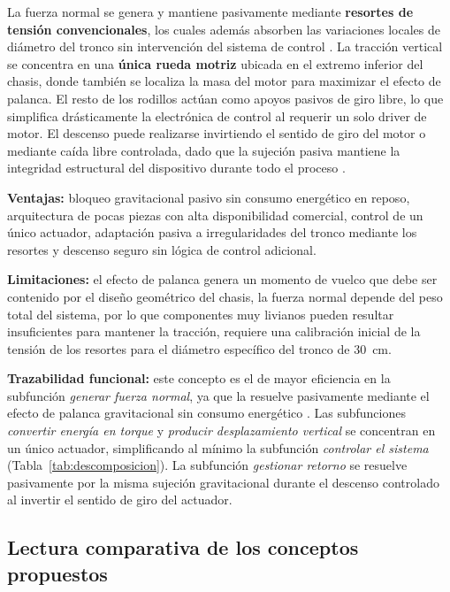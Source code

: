 \documentclass[lettersize,journal]{IEEEtran}
\begin{document}
La fuerza normal se genera y mantiene pasivamente mediante \textbf{resortes de
tensión convencionales}, los cuales además absorben las variaciones locales de
diámetro del tronco sin intervención del sistema de control
\cite{Sadeghi2012HumanInspired}. La tracción vertical se concentra en una
\textbf{única rueda motriz} ubicada en el extremo inferior del chasis, donde
también se localiza la masa del motor para maximizar el efecto de palanca. El
resto de los rodillos actúan como apoyos pasivos de giro libre, lo que simplifica
drásticamente la electrónica de control al requerir un solo driver de motor. El
descenso puede realizarse invirtiendo el sentido de giro del motor o mediante
caída libre controlada, dado que la sujeción pasiva mantiene la integridad
estructural del dispositivo durante todo el proceso
\cite{sibasad2017, ZHENG2024100617}.

\textbf{Ventajas:} bloqueo gravitacional pasivo sin consumo energético en reposo,
arquitectura de pocas piezas con alta disponibilidad comercial, control de un único
actuador, adaptación pasiva a irregularidades del tronco mediante los resortes y
descenso seguro sin lógica de control adicional.

\textbf{Limitaciones:} el efecto de palanca genera un momento de vuelco que debe ser
contenido por el diseño geométrico del chasis, la fuerza normal depende del peso
total del sistema, por lo que componentes muy livianos pueden resultar insuficientes
para mantener la tracción, requiere una calibración inicial de la tensión de los
resortes para el diámetro específico del tronco de \SI{30}{\centi\meter}.

\textbf{Trazabilidad funcional:} este concepto es el de mayor eficiencia en la
subfunción \emph{generar fuerza normal}, ya que la resuelve pasivamente mediante el
efecto de palanca gravitacional sin consumo energético \cite{Sadeghi2012HumanInspired}.
Las subfunciones \emph{convertir energía en torque} y \emph{producir desplazamiento
vertical} se concentran en un único actuador, simplificando al mínimo la subfunción
\emph{controlar el sistema} (Tabla~\ref{tab:descomposicion}). La subfunción
\emph{gestionar retorno} se resuelve pasivamente por la misma sujeción gravitacional
durante el descenso controlado al invertir el sentido de giro del actuador.

\subsection{\textbf{Lectura comparativa de los conceptos propuestos}}
\end{document}
